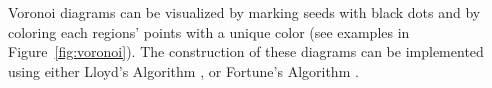 \vspace{-0.5cm} %

Voronoi diagrams can be visualized by marking seeds with black dots and by coloring each regions' points with a unique color (see examples in Figure~\ref{fig:voronoi}).
The construction of these diagrams can be implemented using either Lloyd's Algorithm \cite{voronoi_lloyd}, or Fortune's Algorithm \cite{voronoi_fortune}. 